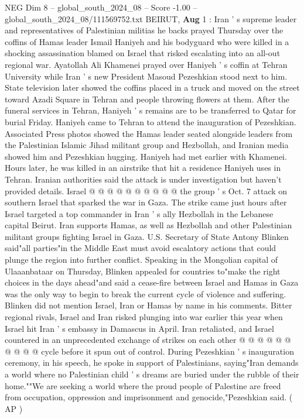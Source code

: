 \begin{textsample}{NEG Dim 8 – global\_south\_2024\_08 – Score -1.00 – global\_south\_2024\_08/111569752.txt}  \label{ex:f8_neg_073}
BEIRUT, \textbf{Aug} 1 : Iran ' s supreme leader and representatives of Palestinian militias he backs prayed Thursday over the coffins of Hamas leader Ismail Haniyeh and his bodyguard who were killed in a shocking assassination blamed on Israel that risked escalating into an all-out regional war.
Ayatollah Ali Khamenei prayed over Haniyeh ' s coffin at Tehran University while Iran ' s new President Masoud Pezeshkian stood next to him.
State television later showed the coffins placed in a truck and moved on the street toward Azadi Square in Tehran and people throwing flowers at them.
After the funeral services in Tehran, Haniyeh ' s remains are to be transferred to Qatar for burial Friday.
Haniyeh came to Tehran to attend the inauguration of Pezeshkian.
Associated Press photos showed the Hamas leader seated alongside leaders from the Palestinian Islamic Jihad militant group and Hezbollah, and Iranian media showed him and Pezeshkian hugging.
Haniyeh had met earlier with Khamenei.
Hours later, he was killed in an airstrike that hit a residence Haniyeh uses in Tehran.
Iranian authorities said the attack is under investigation but haven't provided details.
Israel @ @ @ @ @ @ @ @ @ @ the group ' s Oct. 7 attack on southern Israel that sparked the war in Gaza.
The strike came just hours after Israel targeted a top commander in Iran ' s ally Hezbollah in the Lebanese capital Beirut.
Iran supports Hamas, as well as Hezbollah and other Palestinian militant groups fighting Israel in Gaza.
U.S.
Secretary of State Antony Blinken said"all parties"in the Middle East must avoid escalatory actions that could plunge the region into further conflict.
Speaking in the Mongolian capital of Ulaaanbataar on Thursday, Blinken appealed for countries to"make the right choices in the days ahead"and said a cease-fire between Israel and Hamas in Gaza was the only way to begin to break the current cycle of violence and suffering.
Blinken did not mention Israel, Iran or Hamas by name in his comments.
Bitter regional rivals, Israel and Iran risked plunging into war earlier this year when Israel hit Iran ' s embassy in Damascus in April.
Iran retaliated, and Israel countered in an unprecedented exchange of strikes on each other @ @ @ @ @ @ @ @ @ @ cycle before it spun out of control.
During Pezeshkian ' s inauguration ceremony, in his speech, he spoke in support of Palestinians, saying"Iran demands a world where no Palestinian child ' s dreams are buried under the rubble of their home.""We are seeking a world where the proud people of Palestine are freed from occupation, oppression and imprisonment and genocide,"Pezeshkian said. ( AP )

\end{textsample}
